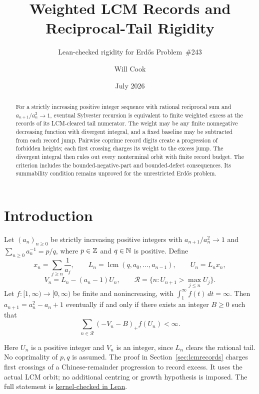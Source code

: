 \documentclass[11pt]{article}
\title{Weighted LCM Records and Reciprocal-Tail Rigidity}
\subtitle{Lean-checked rigidity for Erd\H{o}s Problem~\#243}
\author{Will Cook}
\date{July 2026}
\begin{document}
\maketitle
\noteprovenance

\begin{abstract}
For a strictly increasing positive integer sequence with rational reciprocal
sum and $a_{n+1}/a_n^2\to1$, eventual Sylvester recursion is equivalent to
finite weighted excess at the records of its LCM-cleared tail numerator.
The weight may be any finite nonnegative decreasing function with divergent
integral, and a fixed baseline may be subtracted from each record jump.
Pairwise coprime record digits create a progression of forbidden heights;
each first crossing charges its weight to the excess jump. The divergent
integral then rules out every nonterminal orbit with finite record budget.
The criterion includes the bounded-negative-part and bounded-defect
consequences. Its summability condition remains unproved for the
unrestricted Erd\H{o}s problem.
\end{abstract}

\section{Introduction}\label{sec:problem}

\begin{theorem}\label{res:weightedrecord}
Let $(a_n)_{n\ge0}$ be strictly increasing positive integers with
$a_{n+1}/a_n^2\to1$ and $\sum_{n\ge0}a_n^{-1}=p/q$, where $p\in\mathbb{Z}$
and $q\in\mathbb{N}$ is positive. Define
\[
 x_n=\sum_{j\ge n}\frac1{a_j},\qquad
 L_n=\operatorname{lcm}(q,a_0,\ldots,a_{n-1}),\qquad U_n=L_nx_n,
\]
\[
 V_n=L_n-(a_n-1)U_n,\qquad
 \mathcal R=\{n:U_{n+1}>\max_{j\le n}U_j\}.
\]
Let $f:[1,\infty)\to[0,\infty)$ be finite and nonincreasing, with
$\int_1^\infty f(t)\,dt=\infty$. Then $a_{n+1}=a_n^2-a_n+1$
eventually if and only if there exists an integer $B\ge0$ such that
\[
 \sum_{n\in\mathcal R}(-V_n-B)_+f(U_n)<\infty.
\]
\end{theorem}

Here $U_n$ is a positive integer and $V_n$ is an integer, since $L_n$
clears the rational tail. No coprimality of $p,q$ is assumed.
The proof in Section~\ref{sec:lcmrecords} charges first crossings of a
Chinese-remainder progression to record excess. It uses the actual LCM
orbit; no additional centring or growth hypothesis is imposed.
The full statement is \href{https://github.com/wcook04/plectis-erdos/blob/25ef6245d15a47548c6926369ae8f1a0f0a14a80/ErdosProblems/Erdos243/PaperCompleteR8/CanonicalWeightedRecords.lean#L268}{kernel-checked in Lean}.
\end{document}
